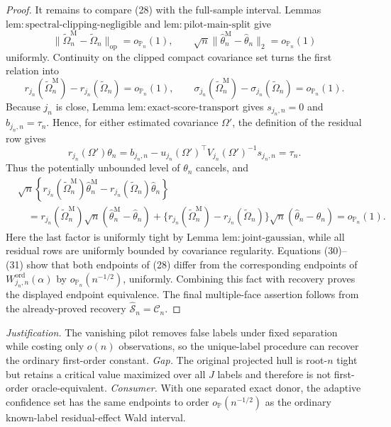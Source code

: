 \documentclass{article}
\begin{document}
\begin{proof}
It remains to compare (28) with the full-sample interval.  Lemmas \(\mathrm{lem:spectral\text{-}clipping\text{-}negligible}\) and \(\mathrm{lem:pilot\text{-}main\text{-}split}\) give
\[
 \|\widetilde\Omega_n^{\mathrm M}-\widetilde\Omega_n\|_{\mathrm{op}}=o_{\mathbb P_n}(1),
 \qquad
 \sqrt n\|\widehat\theta_n^{\mathrm M}-\widehat\theta_n\|_2
 =o_{\mathbb P_n}(1)
\tag{29}
\]
uniformly.  Continuity on the clipped compact covariance set turns the first relation into
\[
 r_{j_n}(\widetilde\Omega_n^{\mathrm M})-r_{j_n}(\widetilde\Omega_n)
 =o_{\mathbb P_n}(1),
 \qquad
 \sigma_{j_n}(\widetilde\Omega_n^{\mathrm M})-\sigma_{j_n}(\widetilde\Omega_n)
 =o_{\mathbb P_n}(1).
\tag{30}
\]
Because \(j_n\) is close, Lemma \(\mathrm{lem:exact\text{-}score\text{-}transport}\) gives \(s_{j_n,n}=0\) and \(b_{j_n,n}=\tau_n\).  Hence, for either estimated covariance \(\Omega'\), the definition of the residual row gives
\[
 r_{j_n}(\Omega')\theta_n
 =b_{j_n,n}-u_{j_n}(\Omega')^{\top}V_{j_n}(\Omega')^{-1}s_{j_n,n}
 =\tau_n.
\]
Thus the potentially unbounded level of \(\theta_n\) cancels, and
\[
\begin{aligned}
 &\sqrt n\left\{
 r_{j_n}(\widetilde\Omega_n^{\mathrm M})\widehat\theta_n^{\mathrm M}
 -r_{j_n}(\widetilde\Omega_n)\widehat\theta_n
 \right\}\\
 &\quad=
 r_{j_n}(\widetilde\Omega_n^{\mathrm M})
 \sqrt n(\widehat\theta_n^{\mathrm M}-\widehat\theta_n)
 +\{r_{j_n}(\widetilde\Omega_n^{\mathrm M})
      -r_{j_n}(\widetilde\Omega_n)\}
 \sqrt n(\widehat\theta_n-\theta_n)
 =o_{\mathbb P_n}(1).
\end{aligned}
\tag{31}
\]
Here the last factor is uniformly tight by Lemma \(\mathrm{lem:joint\text{-}gaussian}\), while all residual rows are uniformly bounded by covariance regularity.  Equations (30)--(31) show that both endpoints of (28) differ from the corresponding endpoints of \(W_{j_n,n}^{\mathrm{ord}}(\alpha)\) by \(o_{\mathbb P_n}(n^{-1/2})\), uniformly.  Combining this fact with recovery proves the displayed endpoint equivalence.  The final multiple-face assertion follows from the already-proved recovery \(\widehat{\mathcal S}_n=\mathcal C_n\).
\end{proof}
\par\smallskip\noindent \textit{Justification.} The vanishing pilot removes false labels under fixed separation while costing only \(o(n)\) observations, so the unique-label procedure can recover the ordinary first-order constant. \textit{Gap.} The original projected hull is root-\(n\) tight but retains a critical value maximized over all \(J\) labels and therefore is not first-order oracle-equivalent. \textit{Consumer.} With one separated exact donor, the adaptive confidence set has the same endpoints to order \(o_{\mathbb P}(n^{-1/2})\) as the ordinary known-label residual-effect Wald interval.
\end{document}
